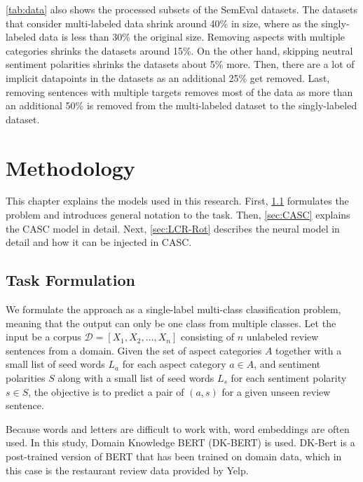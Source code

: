 \documentclass[american, oneside]{ecsgdp}
\begin{document}
\cref{tab:data} also shows the processed subsets of the SemEval datasets. The datasets that consider multi-labeled data shrink around 40\% in size, where as the singly-labeled data is less than 30\% the original size. Removing aspects with multiple categories shrinks the datasets around 15\%. On the other hand, skipping neutral sentiment polarities shrinks the datasets about 5\% more. Then, there are a lot of implicit datapoints in the datasets as an additional 25\% get removed. Last, removing sentences with multiple targets removes most of the data as more than an additional 50\% is removed from the multi-labeled dataset to the singly-labeled dataset.

\chapter{Methodology} \label{chap:methodology}

This chapter explains the models used in this research. First, \cref{sec:formulation} formulates the problem and introduces general notation to the task. Then, \cref{sec:CASC} explains the CASC model in detail. Next, \cref{sec:LCR-Rot} describes the neural model in detail and how it can be injected in CASC.

\section{Task Formulation} \label{sec:formulation} %
We formulate the approach as a single-label multi-class classification problem, meaning that the output can only be one class from multiple classes. Let the input be a corpus $\mathcal{D} = [X_1, X_2, \dots, X_n]$ consisting of $n$ unlabeled review sentences from a domain. Given the set of aspect categories $A$ together with a small list of seed words $L_a$ for each aspect category $a \in A$, and sentiment polarities $S$ along with a small list of seed words $L_s$ for each sentiment polarity $s \in S$, the objective is to predict a pair of $(a, s)$ for a given unseen review sentence.

Because words and letters are difficult to work with, word embeddings are often used. In this study, Domain Knowledge BERT (DK-BERT) \parencite{Xu2019DKBERT} is used. DK-Bert is a post-trained version of BERT \parencite{Devlin2019BERT} that has been trained on domain data, which in this case is the restaurant review data provided by Yelp.
\end{document}
